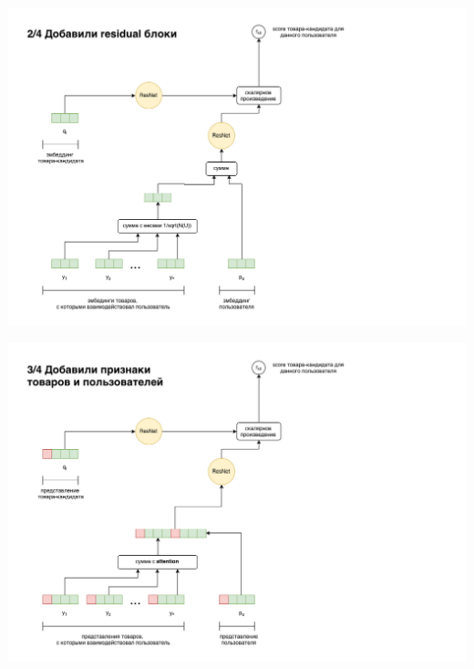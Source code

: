 \documentclass[11pt,aspectratio=169]{beamer}
\begin{document}
\begin{frame}

\begin{center}
\includegraphics[scale=0.3]{images/svdpp-res.png}
\end{center}

\end{frame}

\begin{frame}

\begin{center}
\includegraphics[scale=0.3]{images/svdpp-features.png}
\end{center}

\end{frame}
\end{document}
